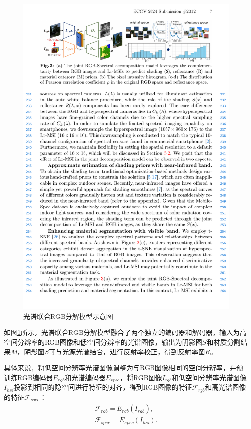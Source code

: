 \documentclass[
    type = master, %
    degree = academic,        %
    decl-page,  %
  ]{njuthesis}
\begin{document}
\begin{figure}[h]
	\centering
	\includegraphics[width=1.0\linewidth]{docs/fig-chap4/fig-4-pipeline.pdf}
	\caption{光谱联合RGB分解模型示意图}
	\label{fig:seg pipeline}
\end{figure}

如图\ref{fig:seg pipeline}所示，光谱联合RGB分解模型融合了两个独立的编码器和解码器，输入为高空间分辨率的RGB图像和低空间分辨率的光谱图像，输出为阴影图$S$和材质分割结果$M$，阴影图$S$可与光源光谱结合，进行反射率校正，得到反射率图$R$。

具体来说，将低空间分辨率光谱图像调整为与RGB图像相同的空间分辨率，并预训练RGB编码器$E_{rgb}$和光谱编码器$E_{spec}$，将RGB图像$I_{r g b}$和低空间分辨率光谱图像$I_{hsi}$投影到相同的隐空间进行特征的对齐，得到RGB图像的特征$\mathcal{F}_{r g b}$和高光谱图像的特征$\mathcal{F}_{spec}$：
\begin{equation}
\begin{align}
    \mathcal{F}_{rgb}=E_{rgb}\left(I_{rgb}\right),\\
    \mathcal{F}_{spec}=E_{spec}\left(I_{hsi}\right).
\end{align}
\end{equation}
\end{document}
